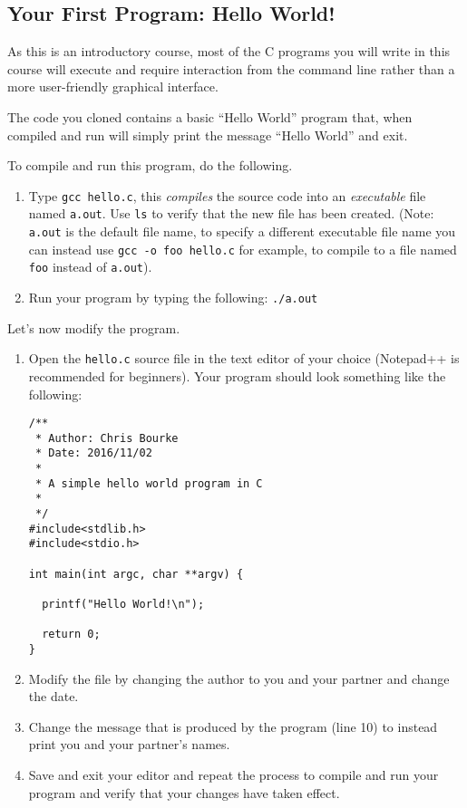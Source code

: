 \documentclass[12pt]{scrartcl}
\begin{document}
\subsection{Your First Program: Hello World!}

As this is an introductory course, most of the C programs you will write in 
this course will execute and require interaction from the command line 
rather than a more user-friendly graphical interface.  

The code you cloned contains a basic ``Hello World'' program that, when
compiled and run will simply print the message ``Hello World'' and exit.

To compile and run this program, do the following.
\begin{enumerate}
  \item Type \texttt{gcc hello.c}, this \emph{compiles} the source code
  	into an \emph{executable} file named \texttt{a.out}.  Use 
	\texttt{ls} to verify that the new file has been created.  (Note: 
	\texttt{a.out} is the default file name, to specify a different
	executable file name you can instead use \texttt{gcc -o foo hello.c}
	for example, to compile to a file named \texttt{foo} instead of
	\texttt{a.out}).
  \item Run your program by typing the following: \texttt{./a.out}
\end{enumerate}

Let's now modify the program. 

\begin{enumerate}
  \item Open the \texttt{hello.c} source file in the text editor of
  	your choice (Notepad++ is recommended for beginners).
  	Your program should look something like the following:

\begin{verbatim}
/**
 * Author: Chris Bourke
 * Date: 2016/11/02
 *
 * A simple hello world program in C
 *
 */
#include<stdlib.h>
#include<stdio.h>

int main(int argc, char **argv) {

  printf("Hello World!\n");

  return 0;
}
\end{verbatim}
  \item Modify the file by changing the author to you and your partner and change
  	the date.
  \item Change the message that is produced by the program (line 10) to instead
  	print you and your partner's names.
  \item Save and exit your editor and repeat the process to compile and run
  	your program and verify that your changes have taken effect.
\end{enumerate}
\end{document}

